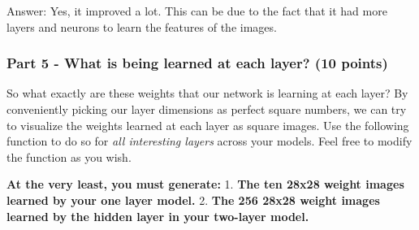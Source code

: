 \documentclass[11pt]{article}
\begin{document}
Answer: Yes, it improved a lot. This can be due to the fact that it had
more layers and neurons to learn the features of the images.

    \hypertarget{part-5---what-is-being-learned-at-each-layer-10-points}{%
\subsubsection{Part 5 - What is being learned at each layer? (10
points)}\label{part-5---what-is-being-learned-at-each-layer-10-points}}

So what exactly are these weights that our network is learning at each
layer? By conveniently picking our layer dimensions as perfect square
numbers, we can try to visualize the weights learned at each layer as
square images. Use the following function to do so for \emph{all
interesting layers} across your models. Feel free to modify the function
as you wish.

\textbf{At the very least, you must generate:} 1. \textbf{The ten 28x28
weight images learned by your one layer model.} 2. \textbf{The 256 28x28
weight images learned by the hidden layer in your two-layer model.}
\end{document}
